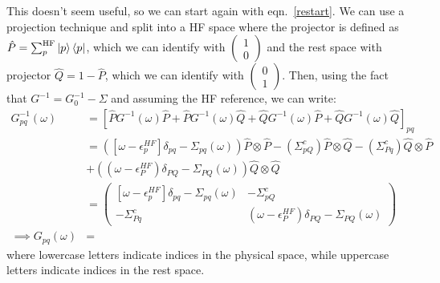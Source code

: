 This doesn't seem useful, so we can start again with eqn.~\ref{restart}.
We can use a projection technique and split into a HF space where the projector is defined as $\hat{P}=\sum_p^{\text{HF}}\ket{p}\bra{p}$, which we can identify with $\begin{pmatrix}1 \\ 0\end{pmatrix}$ and the rest space with projector $\hat{Q}=1-\hat{P}$, which we can identify with $\begin{pmatrix}0 \\ 1\end{pmatrix}$. Then, using the fact that $G^{-1} = G_0^{-1} - \Sigma$ and assuming the HF reference, we can write:
\begin{align}
    G^{-1}_{pq}(\omega) 
&= \left[\hat{P} G^{-1}(\omega) \hat{P} + \hat{P} G^{-1}(\omega) \hat{Q} + \hat{Q} G^{-1}(\omega) \hat{P} + \hat{Q} G^{-1}(\omega) \hat{Q}\right]_{pq} \\
 &= \left(\left[\omega - \epsilon_p^{HF} \right] \delta _{pq}- \Sigma_{pq}(\omega)\right) \hat{P}\otimes \hat{P} - \left(\Sigma^c_{pQ}\right) \hat{P}\otimes \hat{Q} - \left(\Sigma^c_{Pq}\right) \hat{Q}\otimes \hat{P}\\
& + \left( (\omega - \epsilon_P^{HF}) \delta _{PQ} - \Sigma_{PQ}(\omega)\right) \hat{Q}\otimes \hat{Q} \\
&= \begin{pmatrix} \left[\omega - \epsilon_p^{HF} \right] \delta _{pq}- \Sigma_{pq}(\omega) & -\Sigma^c_{pQ} \\ -\Sigma^c_{Pq} & (\omega - \epsilon_P^{HF}) \delta _{PQ} - \Sigma_{PQ}(\omega) \end{pmatrix} \\
\implies G _{pq}(\omega)&=  
\end{align}
where lowercase letters indicate indices in the physical space, while uppercase letters indicate indices in the rest space.
